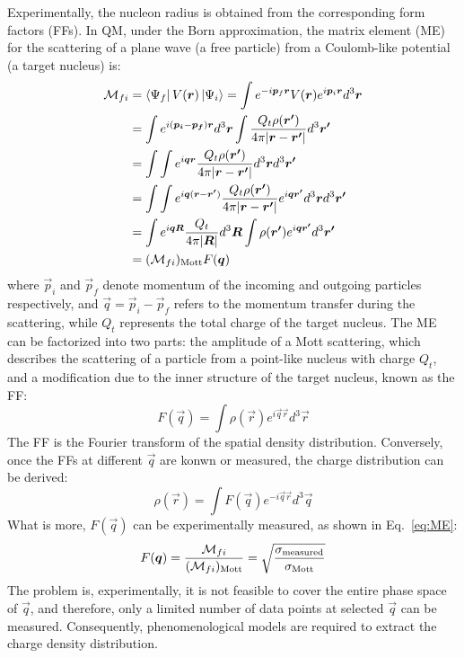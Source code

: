 Experimentally, the nucleon radius is obtained from the corresponding form
factors (FFs). In QM, under the Born approximation, the matrix element (ME) 
for the scattering of a plane wave (a free particle) from a Coulomb-like potential 
(a target nucleus) is:
\begin{equation}
    \begin{aligned}
	\CM_{fi} &= \bra{\Psi_f}V(\vec{r})\ket{\Psi_i} 
		= \int e^{-i\vec{p}_f\vec{r}}V(\vec{r}) e^{i\vec{p}_i\vec{r}} d^3\vec{r}    \\	%
	    &= \int e^{i(\vec{p_i} - \vec{p_f})\vec{r}} d^3\vec{r} 
		\int \frac{Q_t\rho(\vec{r'})}{4\pi|\vec{r} - \vec{r'}|} d^3\vec{r'} \\	%
	    &= \int \int e^{i\vec{q} \vec{r} } 
		 \frac{Q_t \rho(\vec{r'})}{4\pi|\vec{r} - \vec{r'}|} d^3\vec{r} d^3\vec{r'} \\	%
	    &= \int\int e^{i\vec{q}(\vec{r} - \vec{r'})} 
		\frac{Q_t\rho(\vec{r'})}{4\pi|\vec{r} - \vec{r'}|} e^{i\vec{q}\vec{r'}} d^3\vec{r} d^3\vec{r'}   \\  %
	    &= \int e^{i\vec{q}\vec{R}} \frac{Q_t}{4\pi|\vec{R}|} d^3\vec{R} 
		\int \rho(\vec{r'}) e^{i\vec{q} \vec{r'}}d^3 \vec{r'}	\\  %
	    &= (\CM_{fi})_{\text{Mott}} F(\vec{q})   \\	%
    \end{aligned}
    \label{eq:ME}
\end{equation}
where $\vec{p}_i$ and $\vec{p}_f$ denote momentum of the incoming and outgoing particles respectively,
and $\vec{q} = \vec{p}_i - \vec{p}_f$ refers to the momentum transfer during the scattering,
while $Q_t$ represents the total charge of the target nucleus. The ME can be factorized into two parts:
the amplitude of a Mott scattering, which describes the scattering of a particle from 
a point-like nucleus with charge $Q_t$, and a modification
due to the inner structure of the target nucleus, known as the FF:
\begin{equation}
    F(\vec{q}) = \int \rho(\vec{r}) e^{i\vec{q} \vec{r}} d^3\vec{r}
    \label{eq:ff}
\end{equation}
The FF is the Fourier transform of the spatial density distribution.
Conversely, once the FFs at different $\vec{q}$ are konwn or measured, 
the charge distribution can be derived:
\begin{equation}
    \rho(\vec{r}) = \int F(\vec{q}) e^{-i\vec{q}\vec{r}} d^3\vec{q}
\end{equation}
What is more, $F(\vec{q})$ can be experimentally measured, as shown in Eq.~\ref{eq:ME}:
\begin{equation}
    F(\boldsymbol{q}) = \frac{\mathcal{M}_{fi}}{(\mathcal{M}_{fi})_{\text{Mott}}} 
	= \sqrt{\frac{\sigma_{\text{measured}}}{\sigma_{\text{Mott}}}} 
\end{equation}
The problem is, experimentally, it is not feasible to cover the entire phase space 
of $\vec{q}$, and therefore, only a limited number of data points at selected $\vec{q}$ 
can be measured. Consequently, phenomenological models are required to extract the charge density distribution. 


